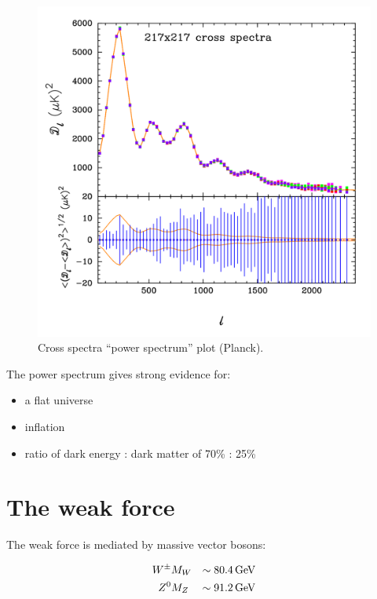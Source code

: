 \begin{figure}[!htb]
  \begin{center}
    \includegraphics[width=\textwidth]{images/chapter_1/powerSpectrum.pdf}
    \caption[Cross spectra ``power spectrum'' plot (Planck)]{Cross spectra ``power spectrum'' plot (Planck). \cite{powerSpectrum}}
    \label{fig:ch1_powerSpectrum}
  \end{center}
\end{figure}

The power spectrum gives strong evidence for:
\begin{itemize}
  \item a flat universe
  \item inflation
  \item ratio of dark energy : dark matter of 70\% : 25\%
\end{itemize}

\section{The weak force}

The weak force is mediated by massive vector bosons:

\begin{eqnarray*}
  W^{\pm} & M_W & \sim 80.4 \mathrm{\,GeV} \\
  Z^0     & M_Z & \sim 91.2 \mathrm{\,GeV}
\end{eqnarray*}

